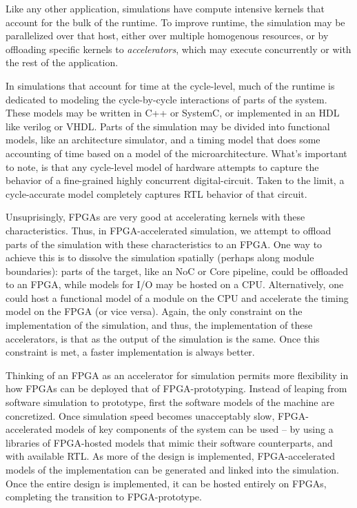 Like any other application, simulations have compute intensive kernels that
account for the bulk of the runtime. To improve runtime, the simulation may be
parallelized over that host, either over multiple homogenous resources, or by
offloading specific kernels to \emph{accelerators}, which may execute
concurrently or with the rest of the application.

In simulations that account for time at the cycle-level, much of the runtime is
dedicated to modeling the cycle-by-cycle interactions of parts of the system.
These models may be written in C++ or SystemC, or implemented in an HDL like
verilog or VHDL. Parts of the simulation may be divided into functional models,
like an architecture simulator, and a timing model that does some accounting of
time based on a model of the microarchitecture. What's important to note, is
that any cycle-level model of hardware attempts to capture the behavior of a
fine-grained highly concurrent digital-circuit. Taken to the limit, a
cycle-accurate model completely captures RTL behavior of that circuit.

Unsuprisingly, FPGAs are very good at accelerating kernels with these
characteristics. Thus, in FPGA-accelerated simulation, we attempt to offload
parts of the simulation with these characteristics to an FPGA. One way to
achieve this is to dissolve the simulation spatially (perhaps along module
boundaries): parts of the target, like an NoC or Core pipeline, could be
offloaded to an FPGA, while models for I/O may be hosted on a CPU.
Alternatively, one could host a functional model of a module on the CPU and
accelerate the timing model on the FPGA (or vice versa).  Again, the only
constraint on the implementation of the simulation, and thus, the
implementation of these accelerators, is that as the output of the simulation
is the same. Once this constraint is met, a faster implementation is always better.

Thinking of an FPGA as an accelerator for simulation permits more flexibility
in how FPGAs can be deployed that of FPGA-prototyping. Instead of leaping from
software simulation to prototype, first the software models of the machine are
concretized. Once simulation speed becomes unacceptably slow, FPGA-accelerated
models of key components of the system can be used -- by using a libraries of
FPGA-hosted models that mimic their software counterparts, and with available
RTL. As more of the design is implemented, FPGA-accelerated models of the
implementation can be generated and linked into the simulation. Once the entire
design is implemented, it can be hosted entirely on FPGAs, completing the
transition to FPGA-prototype.

